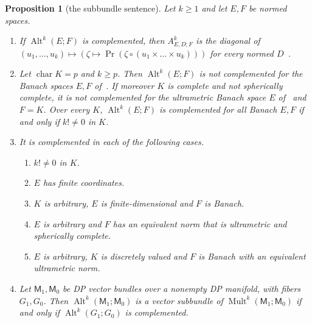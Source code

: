 \documentclass[11pt]{amsart}
\newtheorem{proposition}[theorem]{Proposition}
\theoremstyle{definition}
\theoremstyle{remark}
\numberwithin{equation}{section}
\newcommand{\Alt}{\operatorname{Alt}}
\newcommand{\Mult}{\operatorname{Mult}}
\theoremstyle{plain}
\theoremstyle{definition}
\theoremstyle{plain}
\begin{document}
\begin{proposition}[the subbundle sentence]\label{dp:prop:subbundle}
Let $k\ge1$ and let $E,F$ be normed spaces.
\begin{enumerate}
\item If $\Alt^k(E;F)$ is complemented, then $A^k_{E,D;F}$ is the diagonal of $(u_1,\dots,u_k)\mapsto(\zeta\mapsto\operatorname{Pr}(\zeta\circ(u_1\times\dots\times u_k)))$ for every normed $D$~\cite[Proposition~5.1 and its proof]{I}.
\item Let $\operatorname{char}K=p$ and $k\ge p$. Then $\Alt^k(E;F)$ is not complemented for the Banach spaces $E,F$ of~\cite[Theorem~7.2(1)]{I}. If moreover $K$ is complete and not spherically complete, it is not complemented for the ultrametric Banach space $E$ of~\cite[Theorem~7.2(2)]{I} and $F=K$. Over every $K$, $\Alt^k(E;F)$ is complemented for all Banach $E,F$ if and only if $k!\ne0$ in $K$.
\item It is complemented in each of the following cases.
\begin{enumerate}
\item $k!\ne0$ in $K$.
\item $E$ has finite coordinates.
\item $K$ is arbitrary, $E$ is finite-dimensional and $F$ is Banach.
\item $E$ is arbitrary and $F$ has an equivalent norm that is ultrametric and spherically complete.
\item $E$ is arbitrary, $K$ is discretely valued and $F$ is Banach with an equivalent ultrametric norm.
\end{enumerate}
\item Let $\mathsf M_1,\mathsf M_0$ be DP vector bundles over a nonempty DP manifold, with fibers $G_1,G_0$. Then $\Alt^k(\mathsf M_1;\mathsf M_0)$ is a vector subbundle of $\Mult^k(\mathsf M_1;\mathsf M_0)$ if and only if $\Alt^k(G_1;G_0)$ is complemented.
\end{enumerate}
\end{proposition}
\end{document}
